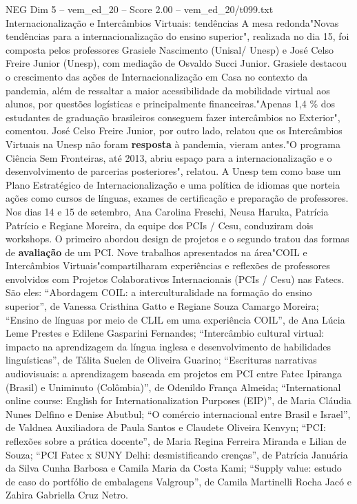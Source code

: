 \begin{textsample}{NEG Dim 5 – vem\_ed\_20 – Score 2.00 – vem\_ed\_20/t099.txt}  \label{ex:f5_neg_062}
Internacionalização e Intercâmbios Virtuais: tendências A mesa redonda"Novas tendências para a internacionalização do ensino superior", realizada no dia 15, foi composta pelos professores Grasiele Nascimento (Unisal/ Unesp) e José Celso Freire Junior (Unesp), com mediação de Osvaldo Succi Junior.
Grasiele destacou o crescimento das ações de Internacionalização em Casa no contexto da pandemia, além de ressaltar a maior acessibilidade da mobilidade virtual aos alunos, por questões logísticas e principalmente financeiras."Apenas 1,4 \% dos estudantes de graduação brasileiros conseguem fazer intercâmbios no Exterior", comentou.
José Celso Freire Junior, por outro lado, relatou que os Intercâmbios Virtuais na Unesp não foram \textbf{resposta} à pandemia, vieram antes."O programa Ciência Sem Fronteiras, até 2013, abriu espaço para a internacionalização e o desenvolvimento de parcerias posteriores", relatou.
A Unesp tem como base um Plano Estratégico de Internacionalização e uma política de idiomas que norteia ações como cursos de línguas, exames de certificação e preparação de professores.
Nos dias 14 e 15 de setembro, Ana Carolina Freschi, Neusa Haruka, Patrícia Patrício e Regiane Moreira, da equipe dos PCIs / Cesu, conduziram dois workshops.
O primeiro abordou design de projetos e o segundo tratou das formas de \textbf{avaliação} de um PCI.
Nove trabalhos apresentados na área"COIL e Intercâmbios Virtuais"compartilharam experiências e reflexões de professores envolvidos com Projetos Colaborativos Internacionais (PCIs / Cesu) nas Fatecs.
São eles: “Abordagem COIL: a interculturalidade na formação do ensino superior”, de Vanessa Cristhina Gatto e Regiane Souza Camargo Moreira; “Ensino de línguas por meio de CLIL em uma experiência COIL”, de Ana Lúcia Leme Prestes e Edilene Gasparini Fernandes; “Intercâmbio cultural virtual: impacto na aprendizagem da língua inglesa e desenvolvimento de habilidades linguísticas”, de Tálita Suelen de Oliveira Guarino; “Escrituras narrativas audiovisuais: a aprendizagem baseada em projetos em PCI entre Fatec Ipiranga (Brasil) e Uniminuto (Colômbia)”, de Odenildo França Almeida; “International online course: English for Internationalization Purposes (EIP)”, de Maria Cláudia Nunes Delfino e Denise Abutbul; “O comércio internacional entre Brasil e Israel”, de Valdnea Auxiliadora de Paula Santos e Claudete Oliveira Kenvyn; “PCI: reflexões sobre a prática docente”, de Maria Regina Ferreira Miranda e Lilian de Souza; “PCI Fatec x SUNY Delhi: desmistificando crenças”, de Patrícia Januária da Silva Cunha Barbosa e Camila Maria da Costa Kami; “Supply value: estudo de caso do portfólio de embalagens Valgroup”, de Camila Martinelli Rocha Jacó e Zahira Gabriella Cruz Netro.

\end{textsample}
